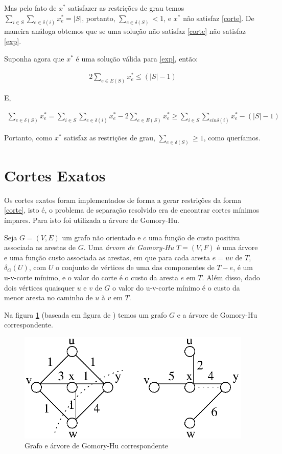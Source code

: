 \documentclass[11pt]{article}
\begin{document}
Mas pelo fato de $x^*$ satisfazer as restrições de grau temos $\sum_{i
  \in S}\sum_{e \in \delta (i)}x_e^* = |S|$, portanto, $\sum_{e \in
  \delta (S)} < 1$, e $x^*$ não satisfaz \eqref{corte}. De maneira
análoga obtemos que se uma solução não satisfaz \eqref{corte} não
satisfaz \eqref{exp}.

Suponha agora que $x^*$ é uma solução válida para \eqref{exp}, então:

\begin{align}
  2\sum_{e \in E(S)}x_e^* \le (|S| - 1)
\end{align}

E,

\begin{align}
  \sum_{e \in \delta (S)}x_e^* = \sum_{i \in S}\sum_{e \in \delta
    (i)}x_e^* - 2\sum_{e \in E(S)}x_e^* \ge \sum_{i \in S}\sum_{e in
    \delta (i)}x_e^* - (|S| - 1)
\end{align}

Portanto, como $x^*$ satisfaz as restrições de grau, $\sum_{e \in
  \delta (S)} \ge 1$, como queríamos.

\section{Cortes Exatos}
Os cortes exatos foram implementados de forma a gerar restrições da
forma \eqref{corte}, isto é, o problema de separação resolvido era de
encontrar cortes mínimos ímpares. Para isto foi utilizada a árvore de
Gomory-Hu.

Seja $G=(V,E)$ um grafo não orientado e $c$ uma função de custo
positiva associada as arestas de $G$. Uma \emph{árvore de Gomory-Hu}
$T=(V,F)$ é uma árvore e uma função custo associada as arestas, em que
para cada aresta $e = uv$ de $T$, $\delta_G(U)$, com $U$ o conjunto de
vértices de uma das componentes de $T-e$, é um u-v-corte mínimo, e o
valor do corte é o custo da aresta $e$ em $T$. Além disso, dado dois
vértices quaisquer $u$ e $v$ de $G$ o valor do u-v-corte mínimo é o
custo da menor aresta no caminho de $u$ à $v$ em $T$.

Na figura \ref{fig:gomoryhu} (baseada em figura de \cite{bondymurty})
temos um grafo $G$ e a árvore de Gomory-Hu correspondente.

\begin{figure}[H]
\centering
\includegraphics[scale=0.40]{gomoryhu.png}
\caption{Grafo e árvore de Gomory-Hu correspondente}
\label{fig:gomoryhu}
\end{figure}
\end{document}

